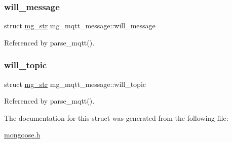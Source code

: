\mbox{\label{structmg__mqtt__message_abf358db60e5a092bd71a52a2dc9d02c7_abf358db60e5a092bd71a52a2dc9d02c7}} 
\subsubsection{\texorpdfstring{will\+\_\+message}{will\_message}}
{\footnotesize\ttfamily struct \hyperlink{structmg__str}{mg\+\_\+str} mg\+\_\+mqtt\+\_\+message\+::will\+\_\+message}



Referenced by parse\+\_\+mqtt().

\mbox{\label{structmg__mqtt__message_a445cb051eb2301102a74561590614322_a445cb051eb2301102a74561590614322}} 
\subsubsection{\texorpdfstring{will\+\_\+topic}{will\_topic}}
{\footnotesize\ttfamily struct \hyperlink{structmg__str}{mg\+\_\+str} mg\+\_\+mqtt\+\_\+message\+::will\+\_\+topic}



Referenced by parse\+\_\+mqtt().



The documentation for this struct was generated from the following file\+:\begin{DoxyCompactItemize}
\item 
\hyperlink{mongoose_8h}{mongoose.\+h}\end{DoxyCompactItemize}
